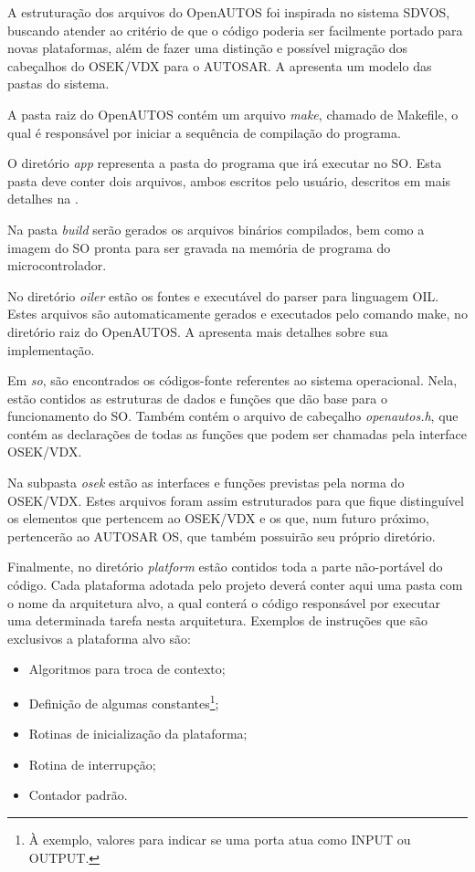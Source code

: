 A estruturação dos arquivos do OpenAUTOS foi inspirada no sistema SDVOS, buscando atender ao critério de que o código poderia ser facilmente portado para novas plataformas, além de fazer uma distinção e possível migração dos cabeçalhos do OSEK/VDX para o AUTOSAR. A  apresenta um modelo das pastas do sistema.


A pasta raiz do OpenAUTOS contém um arquivo \emph{make}, chamado de Makefile, o qual é responsável por iniciar a sequência de compilação do programa.

O diretório \emph{app} representa a pasta do programa que irá executar no SO. Esta pasta deve conter dois arquivos, ambos escritos pelo usuário, descritos em mais detalhes na .

Na pasta \emph{build} serão gerados os arquivos binários compilados, bem como a imagem do SO pronta para ser gravada na memória de programa do microcontrolador.

No diretório \emph{oiler} estão os fontes e executável do parser para linguagem OIL. Estes arquivos são automaticamente gerados e executados pelo comando make, no diretório raiz do OpenAUTOS. A  apresenta mais detalhes sobre sua implementação.

Em \emph{so}, são encontrados os códigos-fonte referentes ao sistema operacional. Nela, estão contidos as estruturas de dados e funções que dão base para o funcionamento do SO. Também contém o arquivo de cabeçalho \emph{openautos.h}, que contém as declarações de todas as funções que podem ser chamadas pela interface OSEK/VDX. 

Na subpasta \emph{osek} estão as interfaces e funções previstas pela norma do OSEK/VDX. Estes arquivos foram assim estruturados para que fique distinguível os elementos que pertencem ao OSEK/VDX e os que, num futuro próximo, pertencerão ao AUTOSAR OS, que também possuirão seu próprio diretório.

Finalmente, no diretório \emph{platform} estão contidos toda a parte não-portável do código. Cada plataforma adotada pelo projeto deverá conter aqui uma pasta com o nome da arquitetura alvo, a qual conterá o código responsável por executar uma determinada tarefa nesta arquitetura. Exemplos de instruções que são exclusivos a plataforma alvo são:

\begin{itemize}
	\item Algoritmos para troca de contexto;
	\item Definição de algumas constantes\footnote{À exemplo, valores para indicar se uma porta atua como INPUT ou OUTPUT.};
	\item Rotinas de inicialização da plataforma;
	\item Rotina de interrupção;
	\item Contador padrão.
\end{itemize}

